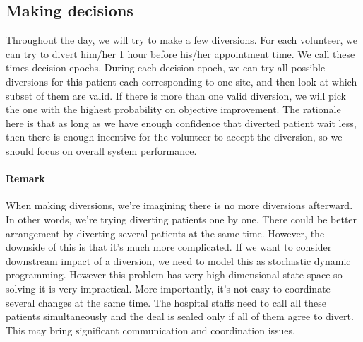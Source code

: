 \subsection{Making decisions}

Throughout the day, we will try to make a few diversions. For each volunteer, we can try to divert him/her 1 hour before his/her appointment time. We call these times decision epochs. During each decision epoch, we can try all possible diversions for this patient each corresponding to one site, and then look at which subset of them are valid. If there is more than one valid diversion, we will pick the one with the highest probability on objective improvement. The rationale here is that as long as we have enough confidence that diverted patient wait less, then there is enough incentive for the volunteer to accept the diversion, so we should focus on overall system performance.

\paragraph{Remark} When making diversions, we're imagining there is no more diversions afterward. In other words, we're trying diverting patients one by one. There could be better arrangement by diverting several patients at the same time. However, the downside of this is that it's much more complicated. If we want to consider downstream impact of a diversion, we need to model this as stochastic dynamic programming. However this problem has very high dimensional state space so solving it is very impractical. More importantly, it's not easy to coordinate several changes at the same time. The hospital staffs need to call all these patients simultaneously and the deal is sealed only if all of them agree to divert. This may bring significant communication and coordination issues.
